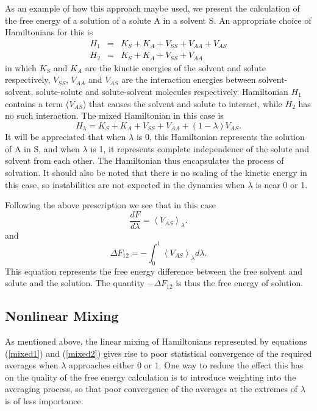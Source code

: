 As an example of how this approach maybe used, we present the calculation of the
free energy of a solution of a solute A in a solvent S.  An appropriate choice 
of Hamiltonians for this is
\begin{eqnarray}
H_{1} &=& K_{S}+K_{A}+V_{SS}+V_{AA}+V_{AS} \nonumber\\
H_{2} &=& K_{S}+K_{A}+V_{SS}+V_{AA}
\end{eqnarray}
in which $K_{S}$ and $K_{A}$ are the kinetic energies of the solvent and
solute respectively, $V_{SS}$, $V_{AA}$ and $V_{AS}$ are the interaction
energies between solvent-solvent, solute-solute and solute-solvent molecules
respectively. Hamiltonian $H_{1}$ contains a term ($V_{AS}$) that causes the
solvent and solute to interact, while $H_{2}$ has no such interaction. The
mixed  Hamiltonian in this case is
\begin{equation}
H_{\lambda}=K_{S}+K_{A}+V_{SS}+V_{AA}+(1-\lambda)V_{AS}. \label{mixed2}
\end{equation}
It will be appreciated that when $\lambda$ is 0, this Hamiltonian represents
the solution of A in S, and when $\lambda$ is 1, it represents complete
independence of the solute and solvent from each other. The Hamiltonian thus
encapsulates the process of solvation. It should also be noted that there is
no scaling of the kinetic energy in this case, so instabilities are not
expected in the dynamics when $\lambda$ is near 0 or 1.

Following the above prescription we see that in this case
\begin{equation}
\frac{d F}{d \lambda} = \left <V_{AS}\right >_{\lambda}. 
\end{equation}
and 
\begin{equation}
\Delta F_{12}=-\int_{0}^{1}\left  <V_{AS}\right >_{\lambda} d\lambda. \label{TI2}
\end{equation}
This  equation represents the free energy difference between the free solvent
and solute and the solution. The quantity $-\Delta F_{12}$ is thus the free
energy of solution.

\subsection{Nonlinear Mixing}

As mentioned above, the linear mixing of Hamiltonians represented by
equations (\ref{mixed1}) and (\ref{mixed2}) gives rise to poor
statistical convergence of the required averages when $\lambda$ approaches
either $0$ or $1$.  One way to reduce the effect this has on the quality of
the free energy calculation is to introduce weighting into the averaging
process, so that poor convergence of the averages at the extremes of $\lambda$
is of less importance.


